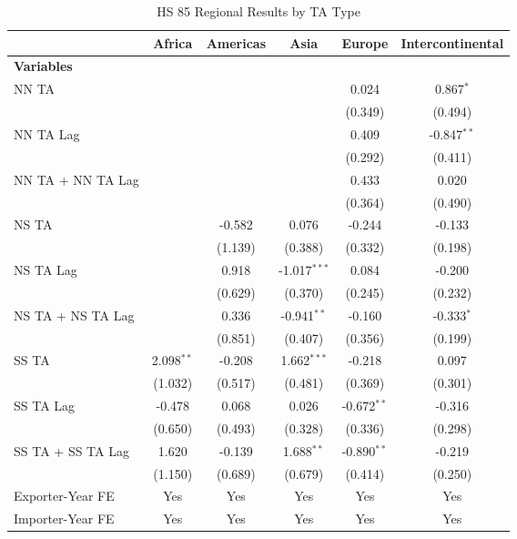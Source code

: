 \begin{table}[htbp]
    \centering
    \caption{HS 85 Regional Results by TA Type}
    \label{tab:85_pta_types}
    \begin{adjustbox}{max width=\textwidth}
    \begin{tabular}{lccccc}
    \hline
     & \multicolumn{1}{c}{Africa} & \multicolumn{1}{c}{Americas} & \multicolumn{1}{c}{Asia} & \multicolumn{1}{c}{Europe} & \multicolumn{1}{c}{Intercontinental} \\
    \hline
    \textbf{Variables} &  &  &  &  &  \\
    \hline
    NN TA &  &  &  & 0.024 & 0.867$^{\ast}$ \\
     &  &  &  & (0.349) & (0.494) \\
    NN TA Lag &  &  &  & 0.409 & -0.847$^{\ast\ast}$ \\
     &  &  &  & (0.292) & (0.411) \\
    NN TA + NN TA Lag &  &  &  & 0.433 & 0.020 \\
     &  &  &  & (0.364) & (0.490) \\
    \hline
    NS TA &  & -0.582 & 0.076 & -0.244 & -0.133 \\
     &  & (1.139) & (0.388) & (0.332) & (0.198) \\
    NS TA Lag &  & 0.918 & -1.017$^{\ast\ast\ast}$ & 0.084 & -0.200 \\
     &  & (0.629) & (0.370) & (0.245) & (0.232) \\
    NS TA + NS TA Lag &  & 0.336 & -0.941$^{\ast\ast}$ & -0.160 & -0.333$^{\ast}$ \\
     &  & (0.851) & (0.407) & (0.356) & (0.199) \\
    \hline
    SS TA & 2.098$^{\ast\ast}$ & -0.208 & 1.662$^{\ast\ast\ast}$ & -0.218 & 0.097 \\
     & (1.032) & (0.517) & (0.481) & (0.369) & (0.301) \\
    SS TA Lag & -0.478 & 0.068 & 0.026 & -0.672$^{\ast\ast}$ & -0.316 \\
     & (0.650) & (0.493) & (0.328) & (0.336) & (0.298) \\
    SS TA + SS TA Lag & 1.620 & -0.139 & 1.688$^{\ast\ast}$ & -0.890$^{\ast\ast}$ & -0.219 \\
     & (1.150) & (0.689) & (0.679) & (0.414) & (0.250) \\
    \hline
    Exporter-Year FE & Yes & Yes & Yes & Yes & Yes \\
    Importer-Year FE & Yes & Yes & Yes & Yes & Yes \\

\end{tabular}
\end{adjustbox}
\end{table}
